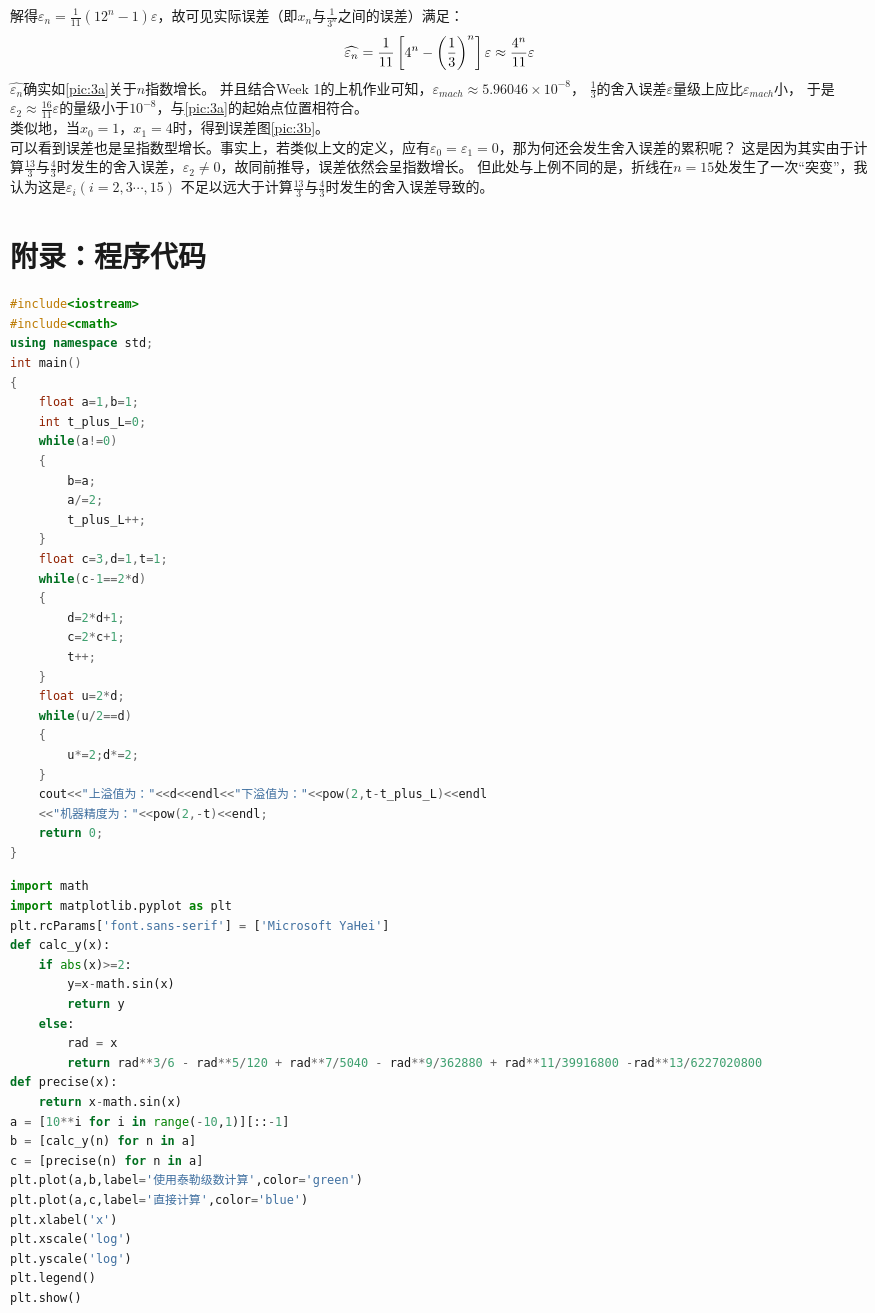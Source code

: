 \documentclass[a4paper,11pt,notitlepage]{article}
\begin{document}
解得$\varepsilon_{n}=\frac{1}{11}(12^{n}-1)\varepsilon$，故可见实际误差（即$x_{n}$与$\frac{1}{3^{n}}$之间的误差）满足：
\begin{equation}
    \widehat{\varepsilon_{n}}=\frac{1}{11}\left[4^{n}-\left(\frac{1}{3}\right)^{n}\right]\varepsilon\approx\frac{4^{n}}{11}\varepsilon \notag
\end{equation}
$\widehat{\varepsilon_{n}}$确实如\cref{pic:3a}关于$n$指数增长。
并且结合Week 1的上机作业可知，$\varepsilon_{mach} \approx 5.96046 \times 10^{-8}$，
$\frac{1}{3}$的舍入误差$\varepsilon$量级上应比$\varepsilon_{mach}$小，
于是$\varepsilon_{2}\approx\frac{16}{11}\varepsilon$的量级小于$10^{-8}$，与\cref{pic:3a}的起始点位置相符合。
\\\indent 类似地，当$x_{0}=1$，$x_{1}=4$时，得到误差图\cref{pic:3b}。
\\\indent 可以看到误差也是呈指数型增长。事实上，若类似上文的定义，应有$\varepsilon_{0}=\varepsilon_{1}=0$，那为何还会发生舍入误差的累积呢？
这是因为其实由于计算$\frac{13}{3}$与$\frac{4}{3}$时发生的舍入误差，$\varepsilon_{2}\neq0$，故同前推导，误差依然会呈指数增长。
但此处与上例不同的是，折线在$n=15$处发生了一次“突变”，我认为这是$\varepsilon_{i}(i=2,3\cdots,15)$
不足以远大于计算$\frac{13}{3}$与$\frac{4}{3}$时发生的舍入误差导致的。

\section{附录：程序代码}
\begin{lstlisting}[language=C++,caption={First Week.cpp}]
#include<iostream>
#include<cmath>
using namespace std;
int main()
{
    float a=1,b=1;
    int t_plus_L=0;
    while(a!=0)
    {
        b=a;
        a/=2;
        t_plus_L++;
    }
    float c=3,d=1,t=1;
    while(c-1==2*d)
    {
        d=2*d+1;
        c=2*c+1;
        t++;
    }
    float u=2*d;
    while(u/2==d)
    {
        u*=2;d*=2;
    }
    cout<<"上溢值为："<<d<<endl<<"下溢值为："<<pow(2,t-t_plus_L)<<endl
    <<"机器精度为："<<pow(2,-t)<<endl;
    return 0;
}
\end{lstlisting}

\begin{lstlisting}[language=Python,caption={Second Week 1.py}]
import math
import matplotlib.pyplot as plt
plt.rcParams['font.sans-serif'] = ['Microsoft YaHei'] 
def calc_y(x):
    if abs(x)>=2:
        y=x-math.sin(x)
        return y
    else:
        rad = x
        return rad**3/6 - rad**5/120 + rad**7/5040 - rad**9/362880 + rad**11/39916800 -rad**13/6227020800
def precise(x):
    return x-math.sin(x)
a = [10**i for i in range(-10,1)][::-1]
b = [calc_y(n) for n in a]
c = [precise(n) for n in a]
plt.plot(a,b,label='使用泰勒级数计算',color='green')
plt.plot(a,c,label='直接计算',color='blue')
plt.xlabel('x')
plt.xscale('log')
plt.yscale('log')
plt.legend()
plt.show()
\end{lstlisting}
\end{document}
